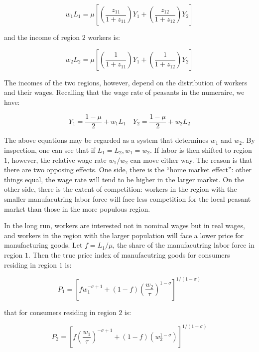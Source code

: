 \begin{equation}
  w_1 L_1 = \mu \left[ (\frac{z_{11}}{1 + z_{11}})Y_1 + (\frac{z_{12}}{1 + z_{12}})Y_2 \right]
\end{equation}

and the income of region $2$ workers is:

\begin{equation}
  w_2 L_2 = \mu \left[ (\frac{1}{1 + z_{11}})Y_1 + (\frac{1}{1 + z_{12}})Y_2 \right]
\end{equation}

The incomes of the two regions, however, depend on the distribution of workers and their wages. Recalling that the wage rate of peasants in the numeraire, we have:

\begin{equation}
  Y_1 = \frac{1 - \mu}{2} + w_1 L_1 \quad Y_2 = \frac{1 - \mu}{2} + w_2 L_2
\end{equation}

The above equations may be regarded as a system that determines $w_1$ and $w_2$. By inspection, one can see that if $L_1 = L_2, w_1 = w_2$. If labor is then shifted to region $1$, however, the relative wage rate $w_1 / w_2$ can move either way. The reason is that there are two opposing effects. One side, there is the ``home market effect'': other things equal, the wage rate will tend to be higher in the larger market. On the other side, there is the extent of competition: workers in the region with the smaller manufacutring labor force will face less competition for the local peasant market than those in the more populous region. 

In the long run, workers are interested not in nominal wages but in real wages, and workers in the region with the larger population will face a lower price for manufacturing goods. Let $f = L_1 / \mu$, the share of the manufacutring labor force in region $1$. Then the true price index of manufacutring goods for consumers residing in region $1$ is:

\begin{equation}
  P_1 = \left[f w_1^{-\sigma + 1} + (1 - f)(\frac{w_2}{\tau})^{1 - \sigma}\right]^{1/(1 - \sigma)}
  \end{equation}

that for consumers residing in region $2$ is:

\begin{equation}
  P_2 = \left[f (\frac{w_1}{\tau})^{-\sigma + 1} + (1 - f)(w_2^{1 - \sigma})\right]^{1/(1 - \sigma)}
\end{equation}

